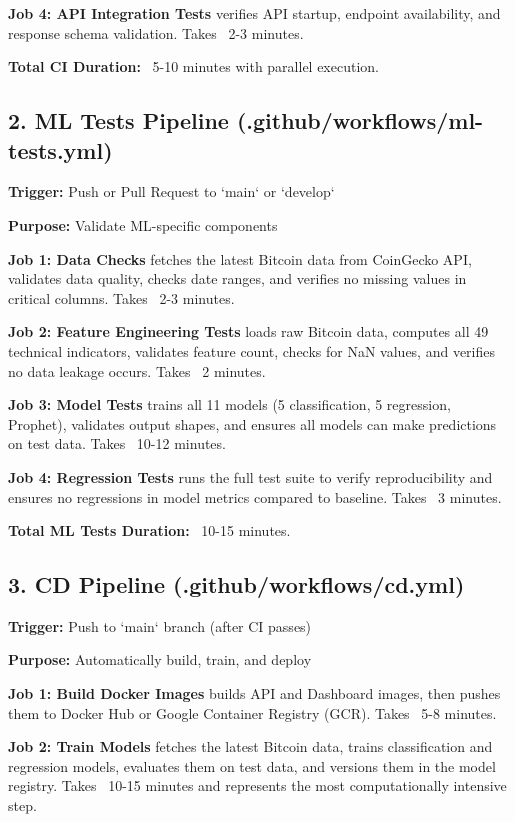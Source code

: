 \textbf{Job 4: API Integration Tests} verifies API startup, endpoint availability, and response schema validation. Takes ~2-3 minutes.

\textbf{Total CI Duration:} ~5-10 minutes with parallel execution.

\subsection{2. ML Tests Pipeline (.github/workflows/ml-tests.yml)}

\textbf{Trigger:} Push or Pull Request to `main` or `develop`

\textbf{Purpose:} Validate ML-specific components

\textbf{Job 1: Data Checks} fetches the latest Bitcoin data from CoinGecko API, validates data quality, checks date ranges, and verifies no missing values in critical columns. Takes ~2-3 minutes.

\textbf{Job 2: Feature Engineering Tests} loads raw Bitcoin data, computes all 49 technical indicators, validates feature count, checks for NaN values, and verifies no data leakage occurs. Takes ~2 minutes.

\textbf{Job 3: Model Tests} trains all 11 models (5 classification, 5 regression, Prophet), validates output shapes, and ensures all models can make predictions on test data. Takes ~10-12 minutes.

\textbf{Job 4: Regression Tests} runs the full test suite to verify reproducibility and ensures no regressions in model metrics compared to baseline. Takes ~3 minutes.

\textbf{Total ML Tests Duration:} ~10-15 minutes.

\subsection{3. CD Pipeline (.github/workflows/cd.yml)}

\textbf{Trigger:} Push to `main` branch (after CI passes)

\textbf{Purpose:} Automatically build, train, and deploy

\textbf{Job 1: Build Docker Images} builds API and Dashboard images, then pushes them to Docker Hub or Google Container Registry (GCR). Takes ~5-8 minutes.

\textbf{Job 2: Train Models} fetches the latest Bitcoin data, trains classification and regression models, evaluates them on test data, and versions them in the model registry. Takes ~10-15 minutes and represents the most computationally intensive step.

